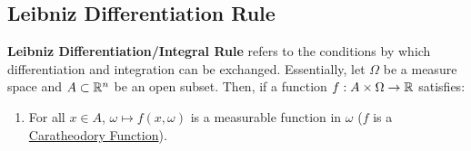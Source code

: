 \subsection{Leibniz Differentiation Rule}
\label{sec:leib_diff_rule}
\textbf{Leibniz Differentiation/Integral Rule} refers to the conditions by which differentiation and integration can be exchanged. Essentially, let $\Omega$ be a measure space and $A\subset\mathbb{R}^n$ be an open subset. Then, if a function $f:A \times \Omega \to \mathbb{R}$ satisfies:
\begin{enumerate}
	\item For all $x\in A$, $\omega\mapsto f(x, \omega)$ is a measurable function in $\omega$ ($f$ is a \underline{Caratheodory Function}).	
\end{enumerate} 

\begin{definition}
	
\end{definition} 

